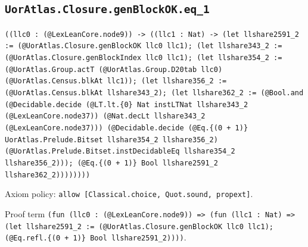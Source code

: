 \documentclass[11pt]{article}
\begin{document}
\subsection*{\texttt{UorAtlas.Closure.genBlockOK.eq\_1}}
\noindent\texttt{((llc0 : (@LexLeanCore.node9)) -> ((llc1 : Nat) -> (let llshare2591\_2 := (@UorAtlas.Closure.genBlockOK llc0 llc1); (let llshare343\_2 := (@UorAtlas.Closure.genBlockIndex llc0 llc1); (let llshare354\_2 := (@UorAtlas.Group.actT (@UorAtlas.Group.D20tab llc0) (@UorAtlas.Census.blkAt llc1)); (let llshare356\_2 := (@UorAtlas.Census.blkAt llshare343\_2); (let llshare362\_2 := (@Bool.and (@Decidable.decide (@LT.lt.\{0\} Nat instLTNat llshare343\_2 (@LexLeanCore.node37)) (@Nat.decLt llshare343\_2 (@LexLeanCore.node37))) (@Decidable.decide (@Eq.\{(0 + 1)\} UorAtlas.Prelude.Bitset llshare354\_2 llshare356\_2) (@UorAtlas.Prelude.Bitset.instDecidableEq llshare354\_2 llshare356\_2))); (@Eq.\{(0 + 1)\} Bool llshare2591\_2 llshare362\_2))))))))}\par
\noindent Axiom policy: \texttt{allow [Classical.choice, Quot.sound, propext]}.\par
\noindent Proof term \texttt{(fun (llc0 : (@LexLeanCore.node9)) => (fun (llc1 : Nat) => (let llshare2591\_2 := (@UorAtlas.Closure.genBlockOK llc0 llc1); (@Eq.refl.\{(0 + 1)\} Bool llshare2591\_2))))}.\par
\end{document}
